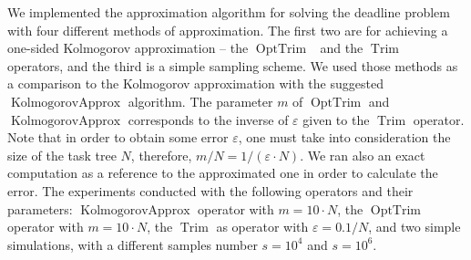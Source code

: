 \documentclass{article}
\DeclareMathOperator{\Trim}{Trim}
\DeclareMathOperator{\KlmApprox}{KolmogorovApprox}
\DeclareMathOperator{\OptTrim}{OptTrim}
\begin{document}
We implemented the approximation algorithm for solving the deadline problem with four different methods of approximation. The first two are for achieving a one-sided Kolmogorov approximation -- the $\OptTrim$~\cite{CohenGW18} and the $\Trim$~\cite{cohen2015estimating} operators, and the third is a simple sampling scheme. We used those methods as a comparison to the Kolmogorov approximation with the suggested $\KlmApprox$ algorithm. 
The parameter $m$ of $\OptTrim$ and $\KlmApprox$ corresponds to the inverse of $\varepsilon$ given to the $\Trim$ operator. Note that in order to obtain some error $\varepsilon$, one must take into consideration the size of the task tree $N$, therefore, $m/N=1/(\varepsilon\cdot N)$. We ran also an exact computation as a reference to the approximated one in order to calculate the error. The experiments conducted with the following operators and their parameters: $\KlmApprox$ operator with $m=10\cdot N$, the $\OptTrim$ operator with $m=10\cdot N$, the $\Trim$ as operator with $\varepsilon={0.1/N}$, and two simple simulations, with a different samples number $s=10^4$ and $s=10^6$. 
\end{document}
